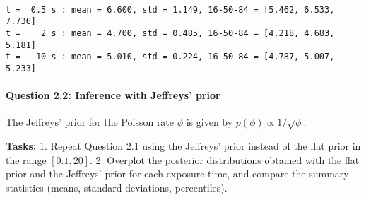 \documentclass[11pt]{article}
\begin{document}
    \begin{center}
    \end{center}
    { \hspace*{\fill} \\}
    
    \begin{Verbatim}[commandchars=\\\{\}]
t =  0.5 s : mean = 6.600, std = 1.149, 16-50-84 = [5.462, 6.533, 7.736]
t =    2 s : mean = 4.700, std = 0.485, 16-50-84 = [4.218, 4.683, 5.181]
t =   10 s : mean = 5.010, std = 0.224, 16-50-84 = [4.787, 5.007, 5.233]
    \end{Verbatim}

    \paragraph{Question 2.2: Inference with Jeffreys'
prior}\label{question-2.2-inference-with-jeffreys-prior}

The Jeffreys' prior for the Poisson rate \(\phi\) is given by
\(p(\phi) \propto 1/\sqrt{\phi}\).

\textbf{Tasks:} 1. Repeat Question 2.1 using the Jeffreys' prior instead
of the flat prior in the range \([0.1, 20]\). 2. Overplot the posterior
distributions obtained with the flat prior and the Jeffreys' prior for
each exposure time, and compare the summary statistics (means, standard
deviations, percentiles).
\end{document}
